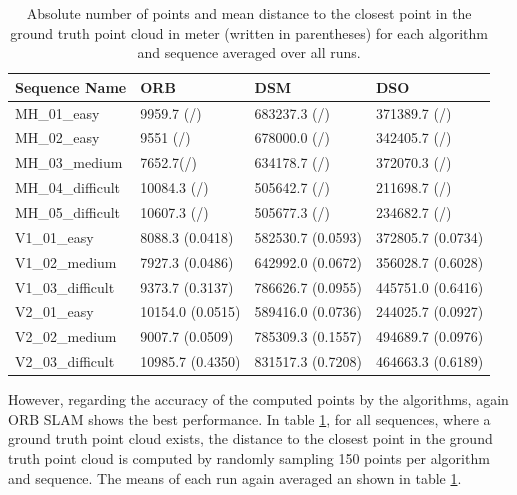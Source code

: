 	\begin{table}
	\caption{Absolute number of points and mean distance to the closest point in the ground truth point cloud in meter (written in parentheses) for each algorithm and sequence averaged over all runs.}
	\begin{tabular}{ |p{3cm}||p{3cm}|p{3cm}|p{3cm}|  }
	\hline
	Sequence Name& ORB & DSM & DSO \\
	\hline
	MH\_01\_easy & 9959.7 (/) & 683237.3 (/) & 371389.7 (/)\\
	MH\_02\_easy & 9551 (/) & 678000.0 (/) & 342405.7 (/)\\
	MH\_03\_medium & 7652.7(/) & 634178.7 (/) & 372070.3 (/)\\
	MH\_04\_difficult & 10084.3 (/) & 505642.7 (/) & 211698.7 (/)\\
	MH\_05\_difficult & 10607.3 (/) & 505677.3 (/) & 234682.7 (/)\\
	V1\_01\_easy & 8088.3 (0.0418) & 582530.7 (0.0593) & 372805.7 (0.0734)\\
	V1\_02\_medium & 7927.3 (0.0486) & 642992.0 (0.0672) & 356028.7 (0.6028)\\
	V1\_03\_difficult & 9373.7 (0.3137) & 786626.7 (0.0955) & 445751.0 (0.6416)\\
	V2\_01\_easy & 10154.0 (0.0515) & 589416.0 (0.0736) & 244025.7 (0.0927)\\
	V2\_02\_medium & 9007.7 (0.0509)& 785309.3 (0.1557) & 494689.7 (0.0976)\\
	V2\_03\_difficult & 10985.7 (0.4350) & 831517.3 (0.7208) & 464663.3 (0.6189)\\
	\hline
	\end{tabular}
	\label{table:pointcloud}
	\end{table}
	
	However, regarding the accuracy of the computed points by the algorithms, again ORB SLAM shows the best performance. In table \ref{table:pointcloud}, 
	for all sequences, where a ground truth point cloud exists, the distance to the closest point in the ground truth point cloud is computed by randomly sampling
	150 points per algorithm and sequence. The means of each run again averaged an shown in table \ref{table:pointcloud}. 
	
	
